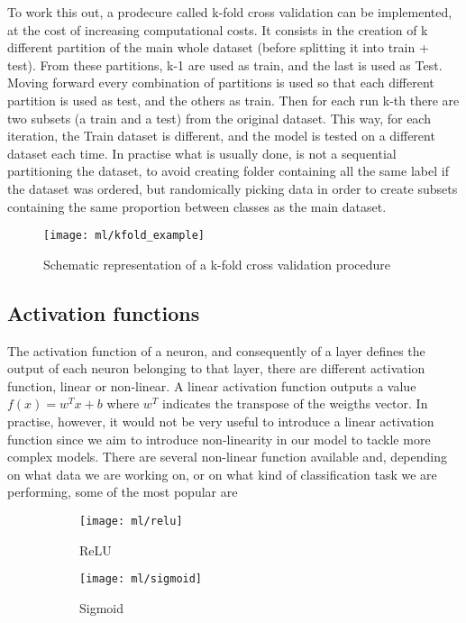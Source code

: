 \documentclass[a4paper,11pt]{article}
\begin{document}
To work this out, a prodecure called k-fold cross validation can be implemented, at the cost of increasing computational costs.
It consists in the creation of k different partition of the main whole dataset (before splitting it into train + test).
From these partitions, k-1 are used as train, and the last is used as Test. Moving forward every combination of partitions is used so that each different partition is used as test, and the others as train.
Then for each run k-th there are two subsets (a train and a test) from the original dataset. This way, for each iteration, the Train dataset is different, and the model is tested on a different dataset each time.
In practise what is usually done, is not a sequential partitioning the dataset, to avoid creating folder containing all the same label if the dataset was ordered, but randomically picking data in order to create subsets containing the same proportion between classes as the main dataset.


\begin{figure}
\texttt{[image: ml/kfold\_example]}
\caption{Schematic representation of a k-fold cross validation procedure}
\label{fig:kfold}
\end{figure}


\subsection{Activation functions}
The activation function of a neuron, and consequently of a layer defines the output of each neuron belonging to that layer, there are different activation function, linear or non-linear.
A linear activation function outputs a value $f(x) = w^T x + b$ where $w^T$ indicates the transpose of the weigths vector.
In practise, however, it would not be very useful to introduce a linear activation function since we aim to introduce non-linearity in our model to tackle more complex models.
There are several non-linear function available and, depending on what data we are working on, or on what kind of classification task we are performing, some of the most popular are


\begin{figure}[h!]
\centering
\begin{subfigure}{0.3\textwidth}
\texttt{[image: ml/relu]}
\caption{ReLU}
\label{}
\end{subfigure}
\begin{subfigure}{0.3\textwidth}
\texttt{[image: ml/sigmoid]}
\caption{Sigmoid}
\label{}
\end{subfigure}
\caption{}
\label{}
\end{figure}
\end{document}
